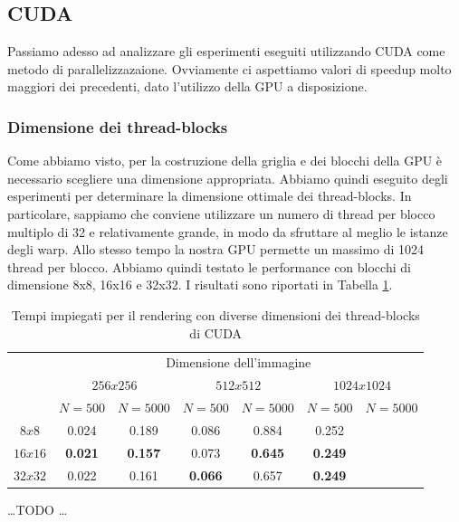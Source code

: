 \subsection{CUDA}\label{subsec:test_cuda}
Passiamo adesso ad analizzare gli esperimenti eseguiti utilizzando CUDA come metodo di parallelizzazaione.
Ovviamente ci aspettiamo valori di speedup molto maggiori dei precedenti, dato l'utilizzo della GPU a disposizione.

\subsubsection{Dimensione dei thread-blocks}
Come abbiamo visto, per la costruzione della griglia e dei blocchi della GPU è necessario scegliere una dimensione appropriata.
Abbiamo quindi eseguito degli esperimenti per determinare la dimensione ottimale dei thread-blocks.
In particolare, sappiamo che conviene utilizzare un numero di thread per blocco multiplo di 32 e relativamente grande, in modo da sfruttare al meglio le istanze degli warp.
Allo stesso tempo la nostra GPU permette un massimo di 1024 thread per blocco.
Abbiamo quindi testato le performance con blocchi di dimensione 8x8, 16x16 e 32x32.
I risultati sono riportati in Tabella \ref{tab:cuda_blocks}.
\begin{table}[H]
    \centering
    \begin{tabular}{c|c|c|c|c|c|c|}
        & \multicolumn{6}{|c|}{Dimensione dell'immagine} \\
        & \multicolumn{2}{|c|}{$256x256$} & \multicolumn{2}{|c|}{$512x512$} & \multicolumn{2}{|c|}{$1024x1024$} \\
        & $N=500$ & $N=5000$ & $N=500$ & $N=5000$ & $N=500$ & $N=5000$ \\
        \hline
        $8x8$ & 0.024 & 0.189 & 0.086 & 0.884 & 0.252 & \\
        $16x16$ & \textbf{0.021} & \textbf{0.157} & 0.073 & \textbf{0.645} & \textbf{0.249} &  \\
        $32x32$ & 0.022 & 0.161 & \textbf{0.066} & 0.657 & \textbf{0.249} &  \\
    \end{tabular}
    \caption{\label{tab:cuda_blocks}Tempi impiegati per il rendering con diverse dimensioni dei thread-blocks di CUDA}
\end{table}

\dots TODO \dots

